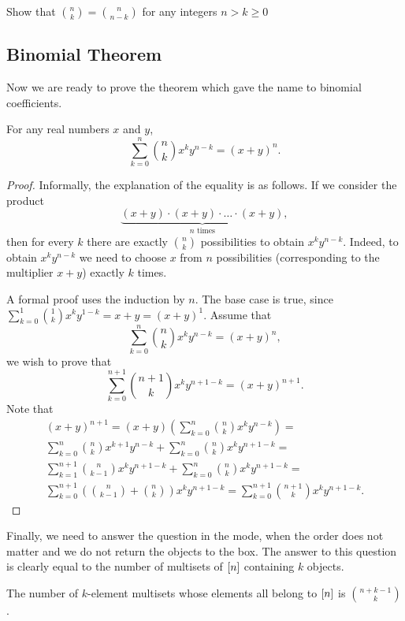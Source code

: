 \begin{exercise}
  Show that $\binom{n}{k} = \binom{n}{n - k}$ for any integers $n > k \ge 0$
\end{exercise}


\subsection{Binomial Theorem}
Now we are ready to prove the theorem which gave the name to binomial
coefficients.
\begin{theorem}
\label{theorem:binomial}
  For any real numbers $x$ and $y$,
    \[
      \sum_{k = 0}^n \binom{n}{k} x^k y^{n - k} = (x + y)^n.
    \]
\end{theorem}
\begin{proof}
  Informally, the explanation of the equality is as follows.
  If we consider the product
  \[
    \underbrace{(x + y) \cdot (x + y) \cdot
      \ldots \cdot (x + y)}_{n \text{ times}},
  \]
  then for every $k$ there are exactly $\binom{n}{k}$ possibilities to obtain
  $x^k y^{n - k}$. Indeed, to obtain $x^k y^{n - k}$ we need to choose $x$ from
  $n$ possibilities (corresponding to the multiplier $x + y$) exactly $k$ times.

  A formal proof uses the induction by $n$. The base case is
  true, since $\sum_{k = 0}^1 \binom{1}{k} x^k y^{1 - k} = x + y =
  (x + y)^1$. Assume that
  \[
    \sum_{k = 0}^n \binom{n}{k} x^k y^{n - k} = (x + y)^n,
  \]
  we wish to prove that
  \[
    \sum_{k = 0}^{n + 1} \binom{n + 1}{k} x^k y^{n + 1 - k} =
      (x + y)^{n + 1}.
  \]
  Note that
  \begin{multline*}
    (x + y)^{n + 1} = (x + y)
      \left(
        \sum_{k = 0}^n \binom{n}{k} x^k y^{n - k}
      \right) = \\
    \sum_{k = 0}^n \binom{n}{k} x^{k + 1} y^{n - k} +
      \sum_{k = 0}^n \binom{n}{k} x^{k} y^{n + 1 - k} = \\
    \sum_{k = 1}^{n + 1} \binom{n}{k - 1} x^k y^{n + 1 - k} +
      \sum_{k = 0}^n \binom{n}{k} x^k y^{n + 1 - k} = \\
    \sum_{k = 0}^{n + 1}
      \left(
        \binom{n}{k - 1} + \binom{n}{k}
      \right)
      x^k y^{n + 1 - k} =
    \sum_{k = 0}^{n + 1} \binom{n + 1}{k} x^k y^{n + 1 - k}.
  \end{multline*}
\end{proof}

Finally, we need to answer the question in the mode, when the order does not
matter and we do not return the objects to the box. The answer to this question
is clearly equal to the number of multisets of ${[{n}]}$ containing $k$
objects.
\begin{theorem}
\label{theorem:multisets}
  The number of $k$-element multisets whose elements all belong to ${[{n}]}$ is
  $\binom{n + k - 1}{k}$.
\end{theorem}

